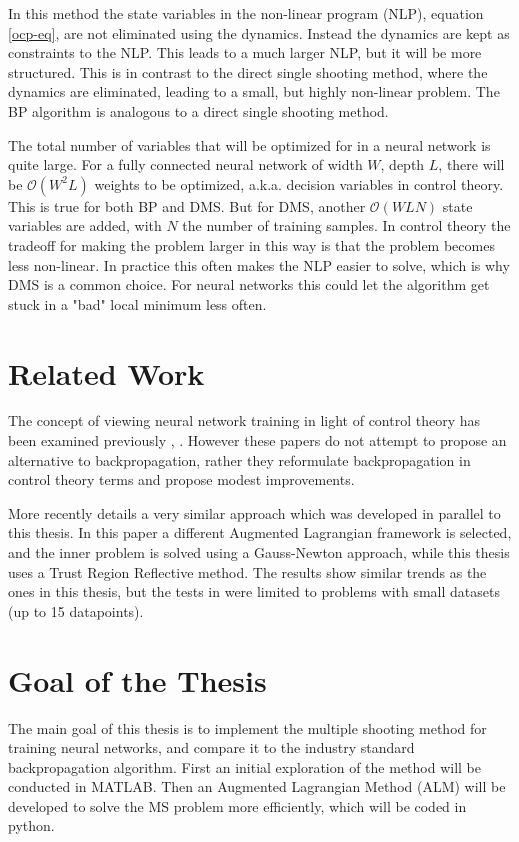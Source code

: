In this method the state variables in the non-linear program (NLP), equation \ref{ocp-eq}, are not eliminated using the dynamics. Instead the dynamics are kept as constraints to the NLP. This leads to a much larger NLP, but it will be more structured. This is in contrast to the direct single shooting method, where the dynamics are eliminated, leading to a small, but highly non-linear problem. The BP algorithm is analogous to a direct single shooting method.

The total number of variables that will be optimized for in a neural network is quite large. For a fully connected neural network of width $W$, depth $L$, there will be $\mathcal{O}(W^2L)$ weights to be optimized, a.k.a. decision variables in control theory. This is true for both BP and DMS. But for DMS, another $\mathcal{O}(WLN)$ state variables are added, with $N$ the number of training samples. In control theory the tradeoff for making the problem larger in this way is that the problem becomes less non-linear. In practice this often makes the NLP easier to solve, which is why DMS is a common choice. For neural networks this could let the algorithm get stuck in a "bad" local minimum less often.

\section{Related Work}
The concept of viewing neural network training in light of control theory has been examined previously \cite{dreyfus1990}, \cite{mizutani2000}. However these papers do not attempt to propose an alternative to backpropagation, rather they reformulate backpropagation in control theory terms and propose modest improvements.

More recently \cite{evens2021neural} details a very similar approach which was developed in parallel to this thesis. In this paper a different Augmented Lagrangian framework is selected, and the inner problem is solved using a Gauss-Newton approach, while this thesis uses a Trust Region Reflective method. The results show similar trends as the ones in this thesis, but the tests in \cite{evens2021neural} were limited to problems with small datasets (up to 15 datapoints).

\section{Goal of the Thesis}
The main goal of this thesis is to implement the multiple shooting method for training neural networks, and compare it to the industry standard backpropagation algorithm. First an initial exploration of the method will be conducted in MATLAB. Then an Augmented Lagrangian Method (ALM) will be developed to solve the MS problem more efficiently, which will be coded in python.

